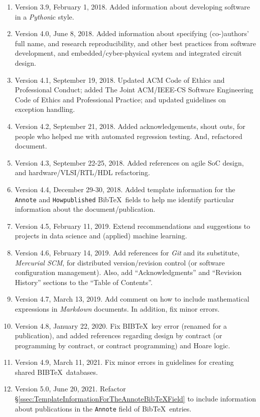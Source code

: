 \documentclass[letter,12pt]{article}
\begin{document}
\begin{enumerate}
\item Version 3.9, February 1, 2018. Added information about developing software in a {\it Python}ic style.
\item Version 4.0, June 8, 2018. Added information about specifying (co-)authors' full name, and research reproducibility, and other best practices from software development, and embedded/cyber-physical system and integrated circuit design.
\item Version 4.1, September 19, 2018. Updated ACM Code of Ethics and Professional Conduct; added The Joint {ACM/IEEE-CS} Software Engineering Code of Ethics and Professional Practice; and updated guidelines on exception handling.
\item Version 4.2, September 21, 2018. Added acknowledgements, shout outs, for people who helped me with automated regression testing. And, refactored document.
\item Version 4.3, September 22-25, 2018. Added references on agile SoC design, and hardware/VLSI/RTL/HDL refactoring.
\item Version 4.4, December 29-30, 2018. Added template information for the {\tt Annote} and {\tt Howpublished} {\sc Bib}\TeX\ fields to help me identify particular information about the document/publication.
\item Version 4.5, February 11, 2019. Extend recommendations and suggestions to projects in data science and (applied) machine learning.
\item Version 4.6, February 14, 2019. Add references for {\it Git} and its substitute, {\it Mercurial SCM}, for distributed version/revision control (or software configuration management). Also, add ``Acknowledgments'' and ``Revision History'' sections to the ``Table of Contents''.
\item Version 4.7, March 13, 2019. Add comment on how to include mathematical expressions in {\it Markdown} documents. In addition, fix minor errors.
\item Version 4.8, January 22, 2020. Fix B{\scriptsize IB}\TeX\ key error (renamed for a publication), and added references regarding design by contract (or programming by contract, or contract programming) and Hoare logic.
\item Version 4.9, March 11, 2021. Fix minor errors in guidelines for creating shared B{\scriptsize IB}\TeX\ databases.
\item Version 5.0, June 20, 2021. Refactor \S\ref{ssec:TemplateInformationForTheAnnoteBibTeXField} to include information about publications in the {\tt Annote} field of {\sc Bib}\TeX\ entries.

\end{enumerate}
\end{document}
